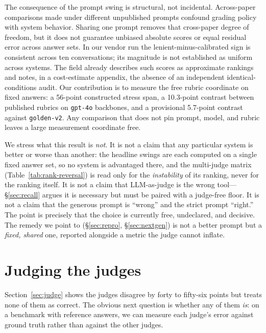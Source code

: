 \documentclass[11pt]{article}
\begin{document}
The consequence of the prompt swing is structural, not incidental. Across-paper comparisons made under different unpublished prompts confound grading policy with system behavior. Sharing one prompt removes that cross-paper degree of freedom, but it does not guarantee unbiased absolute scores or equal residual error across answer sets. In our vendor run the lenient-minus-calibrated sign is consistent across ten conversations; its magnitude is not established as uniform across systems. The field already describes such scores as approximate rankings\citep[\S5.3]{synthius} and notes, in a cost-estimate appendix, the absence of an independent identical-conditions audit.\citep[App.~A.5]{synthius} Our contribution is to measure the free rubric coordinate on fixed answers: a 56-point constructed stress span, a 10.3-point contrast between published rubrics on \texttt{gpt-4o} backbones, and a provisional 5.7-point contrast against \texttt{golden-v2}. Any comparison that does not pin prompt, model, and rubric leaves a large measurement coordinate free.

We stress what this result is \emph{not}. It is not a claim that any particular system is better or worse than another: the headline swings are each computed on a single fixed answer set, so no system is advantaged there, and the multi-judge matrix (Table~\ref{tab:rank-reversal}) is read only for the \emph{instability} of its ranking, never for the ranking itself. It is not a claim that LLM-as-judge is the wrong tool---\S\ref{sec:recall} argues it is necessary but must be paired with a judge-free floor. It is not a claim that the generous prompt is ``wrong'' and the strict prompt ``right.'' The point is precisely that the choice is currently free, undeclared, and decisive. The remedy we point to (\S\ref{sec:repro}, \S\ref{sec:nextgen}) is not a better prompt but a \emph{fixed, shared} one, reported alongside a metric the judge cannot inflate.

\section{Judging the judges}\label{sec:judges-error}

Section~\ref{sec:judge} shows the judges disagree by forty to fifty-six points but treats none of them as correct. The obvious next question is whether any of them \emph{is}: on a benchmark with reference answers, we can measure each judge's error against ground truth rather than against the other judges.
\end{document}
